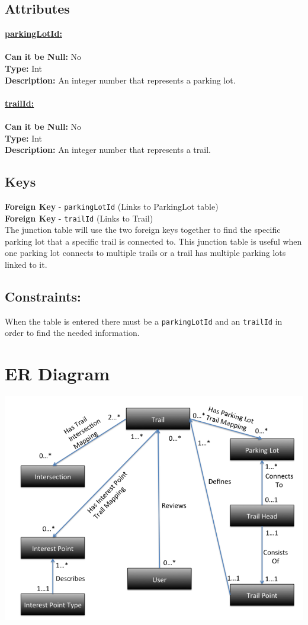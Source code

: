 \subsection{Attributes}
\textbf{\underline{parkingLotId:}}\\
\\
\textbf{Can it be Null:} No\\
\textbf{Type:} Int\\
\textbf{Description:}
An integer number that represents a parking lot. \\\\
\textbf{\underline{trailId:}}\\
\\
\textbf{Can it be Null:} No\\
\textbf{Type:} Int\\
\textbf{Description:}
An integer number that represents a trail.

\subsection{Keys}
\textbf{Foreign Key} - \texttt{parkingLotId} (Links to ParkingLot table)\\
\textbf{Foreign Key} - \texttt{trailId} (Links to Trail)\\
The junction table will use the two foreign keys together to find the specific
parking lot that a specific trail is connected to. This junction table is useful when one parking lot connects to multiple trails
or a trail has multiple parking lots linked to it.

\subsection{Constraints:}
When the table is entered there must be a \texttt{parkingLotId} and an \texttt{trailId} in order to find the needed information.










\newpage
\section{ER Diagram}
\begin{center}
\includegraphics[scale=0.75]{ER_Diagram}
\end{center}


